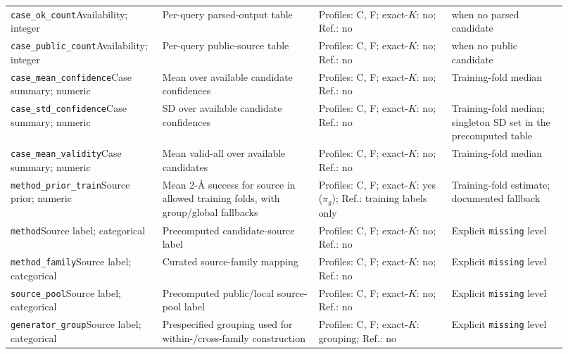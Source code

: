 \begin{longtable}{@{}>{\raggedright\arraybackslash}p{0.22\linewidth}>{\raggedright\arraybackslash}p{0.27\linewidth}>{\raggedright\arraybackslash}p{0.23\linewidth}>{\raggedright\arraybackslash}p{0.20\linewidth}@{}}
\texttt{case_ok_count}\newline Availability; integer & Per-query parsed-output table & Profiles: C, F; exact-$K$: no; Ref.: no & 0 when no parsed candidate\\
\texttt{case_public_count}\newline Availability; integer & Per-query public-source table & Profiles: C, F; exact-$K$: no; Ref.: no & 0 when no public candidate\\
\texttt{case_mean_confidence}\newline Case summary; numeric & Mean over available candidate confidences & Profiles: C, F; exact-$K$: no; Ref.: no & Training-fold median\\
\texttt{case_std_confidence}\newline Case summary; numeric & SD over available candidate confidences & Profiles: C, F; exact-$K$: no; Ref.: no & Training-fold median; singleton SD set in the precomputed table\\
\texttt{case_mean_validity}\newline Case summary; numeric & Mean valid-all over available candidates & Profiles: C, F; exact-$K$: no; Ref.: no & Training-fold median\\
\texttt{method_prior_train}\newline Source prior; numeric & Mean 2-\AA{} success for source in allowed training folds, with group/global fallbacks & Profiles: C, F; exact-$K$: yes ($\pi_g$); Ref.: training labels only & Training-fold estimate; documented fallback\\
\texttt{method}\newline Source label; categorical & Precomputed candidate-source label & Profiles: C, F; exact-$K$: no; Ref.: no & Explicit \texttt{missing} level\\
\texttt{method_family}\newline Source label; categorical & Curated source-family mapping & Profiles: C, F; exact-$K$: no; Ref.: no & Explicit \texttt{missing} level\\
\texttt{source_pool}\newline Source label; categorical & Precomputed public/local source-pool label & Profiles: C, F; exact-$K$: no; Ref.: no & Explicit \texttt{missing} level\\
\texttt{generator_group}\newline Source label; categorical & Prespecified grouping used for within-/cross-family construction & Profiles: C, F; exact-$K$: grouping; Ref.: no & Explicit \texttt{missing} level\\
\end{longtable}

